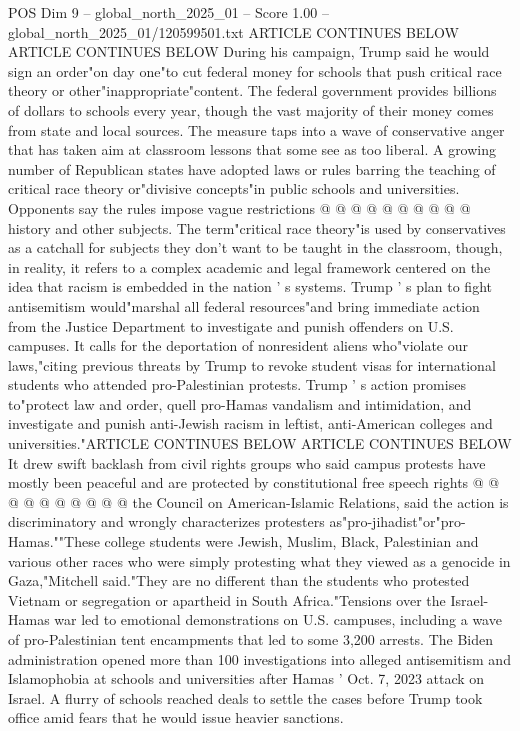 \begin{textsample}{POS Dim 9 – global\_north\_2025\_01 – Score 1.00 – global\_north\_2025\_01/120599501.txt}
ARTICLE CONTINUES BELOW ARTICLE CONTINUES BELOW During his campaign, Trump said he would sign an order"on day one"to cut federal money for schools that push critical race theory or other"inappropriate"content.
The federal government provides billions of dollars to schools every year, though the vast majority of their money comes from state and local sources.
The measure taps into a wave of conservative anger that has taken aim at classroom lessons that some see as too liberal.
A growing number of Republican states have adopted laws or rules barring the teaching of critical race theory or"divisive concepts"in public schools and universities.
Opponents say the rules impose vague restrictions @ @ @ @ @ @ @ @ @ @ history and other subjects.
The term"critical race theory"is used by conservatives as a catchall for subjects they don't want to be taught in the classroom, though, in reality, it refers to a complex academic and legal framework centered on the idea that racism is embedded in the nation ' s systems.
Trump ' s plan to fight antisemitism would"marshal all federal resources"and bring immediate action from the Justice Department to investigate and punish offenders on U.S. campuses.
It calls for the deportation of nonresident aliens who"violate our laws,"citing previous threats by Trump to revoke student visas for international students who attended pro-Palestinian protests.
Trump ' s action promises to"protect law and order, quell pro-Hamas vandalism and intimidation, and investigate and punish anti-Jewish racism in leftist, anti-American colleges and universities."ARTICLE CONTINUES BELOW ARTICLE CONTINUES BELOW It drew swift backlash from civil rights groups who said campus protests have mostly been peaceful and are protected by constitutional free speech rights @ @ @ @ @ @ @ @ @ @ the Council on American-Islamic Relations, said the action is discriminatory and wrongly characterizes protesters as"pro-jihadist"or"pro-Hamas.""These college students were Jewish, Muslim, Black, Palestinian and various other races who were simply protesting what they viewed as a genocide in Gaza,"Mitchell said."They are no different than the students who protested Vietnam or segregation or apartheid in South Africa."Tensions over the Israel-Hamas war led to emotional demonstrations on U.S. campuses, including a wave of pro-Palestinian tent encampments that led to some 3,200 arrests.
The Biden administration opened more than 100 investigations into alleged antisemitism and Islamophobia at schools and universities after Hamas ' Oct. 7, 2023 attack on Israel.
A flurry of schools reached deals to settle the cases before Trump took office amid fears that he would issue heavier sanctions.

\end{textsample}
